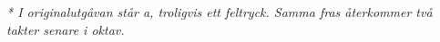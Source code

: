 \vspace{5mm}
\textit{* I originalutgåvan står a, troligvis ett feltryck. Samma fras återkommer två takter senare i oktav.}
